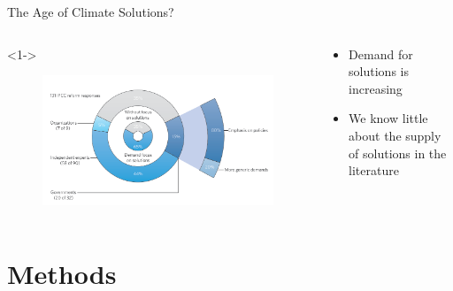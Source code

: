 \documentclass[9pt, aspectratio=169]{beamer}
\begin{document}
\begin{frame}{The Age of Climate Solutions? }
\begin{columns}
	
	\begin{column}{0.618\linewidth}<1->
		\begin{figure}[h!]
			\begin{center}
				\includegraphics[width=\linewidth]{../plots/kowarsch-solutions.png}
				\caption{\citep{Kowarsch2017}}
			\end{center}
		\end{figure}
		
	\end{column}
	\begin{column}{0.382\linewidth}
		\begin{itemize}
			\item<1-> Demand for solutions is increasing
			\item<2-> We know little about the supply of solutions in the literature
			
			
		\end{itemize}
	\end{column}
\end{columns}
\end{frame}


\section{Methods}
\frame{\tableofcontents[currentsection]}
\end{document}
